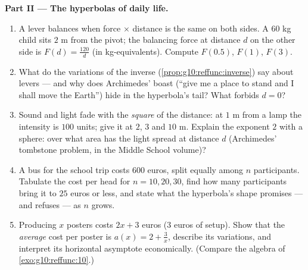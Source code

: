 \begin{problem}
\medskip
\noindent\textbf{Part II --- The hyperbolas of daily life.}
\begin{enumerate}[resume]
  \item A lever balances when force $\times$ distance is the
        same on both sides. A $60$ kg child sits $2$ m from the
        pivot; the balancing force at distance $d$ on the other
        side is $F(d) = \frac{120}{d}$ (in kg-equivalents).
        Compute $F(0.5)$, $F(1)$, $F(3)$.
  \item What do the variations of the inverse 
        (\cref{prop:g10:reffunc:inverse}) say about levers ---
        and why does Archimedes' boast (``give me a place to
        stand and I shall move the Earth'') hide in the
        hyperbola's tail? What forbids $d = 0$?
  \item Sound and light fade with the \emph{square} of the
        distance: at $1$ m from a lamp the intensity is $100$
        units; give it at $2$, $3$ and $10$ m. Explain the
        exponent $2$ with a sphere: over what area has the light
        spread at distance $d$ (Archimedes' tombstone problem, in the Middle School volume)?
  \item A bus for the school trip costs $600$ euros, split
        equally among $n$ participants. Tabulate the cost per
        head for $n = 10, 20, 30$, find how many participants
        bring it to $25$ euros or less, and state what the
        hyperbola's shape promises --- and refuses --- as $n$
        grows.
  \item Producing $x$ posters costs $2x + 3$ euros ($3$ euros of
        setup). Show that the \emph{average} cost per poster is
        $a(x) = 2 + \frac3x$, describe its variations, and
        interpret its horizontal asymptote economically.
        (Compare the algebra of \cref{exo:g10:reffunc:10}.)
\end{enumerate}


\end{problem}
